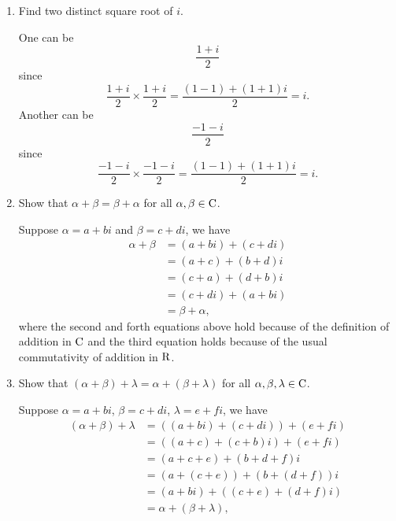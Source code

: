 \begin{enumerate}
    \item Find two distinct square root of $i$.
        \begin{solution}
            One can be 
            \[ \dfrac{1+i}{2}\]
            since 
            \[ \dfrac{1+i}{2} \times \dfrac{1+i}{2} = \dfrac{(1-1)+(1+1)i}{2} = i .\]
            Another can be 
            \[  \dfrac{-1-i}{2} \]
            since 
            \[ \dfrac{-1-i}{2} \times \dfrac{-1-i}{2} = \dfrac{(1-1) + (1+1)i}{2} = i.\]
        \end{solution}
    \item Show that $\alpha+\beta = \beta + \alpha$ for all $\alpha,\beta \in \mathrm{C}$.
        \begin{solution}
            Suppose $\alpha = a + bi$ and $\beta = c +di$, we have 
            \begin{align*}
                \alpha + \beta &= (a+bi) + (c+di) \\
                               &= (a+c) + (b+d)i \\
                               &= (c+a) + (d+b)i \\
                               &= (c+di) + (a+bi) \\
                               &= \beta + \alpha,
            \end{align*}
            where the second and forth equations above hold because of the definition of addition in $\mathrm{C}$ and the third equation holds because 
            of the usual commutativity of addition in $\mathrm{R}$.
        \end{solution}
    \item Show that $(\alpha+\beta) + \lambda = \alpha + (\beta + \lambda)$ for all $\alpha, \beta, \lambda \in \mathrm{C}$.
        \begin{solution}
            Suppose $\alpha = a+bi$, $\beta = c+di$, $\lambda = e + fi$, we have 
            \begin{align*}
                (\alpha + \beta) + \lambda &= \left((a+bi) + (c+di)\right) + (e + fi) \\
                                           &= \left( (a+c) + (c+b)i\right) + (e+fi) \\
                                           &= (a+c+e) + (b+d+f)i \\
                                           &= (a+(c+e)) + (b+(d+f))i \\
                                           &= (a+bi) + \left((c+e)+(d+f)i\right) \\
                                           &= \alpha + (\beta + \lambda),

\end{align*}
\end{solution}
\end{enumerate}
